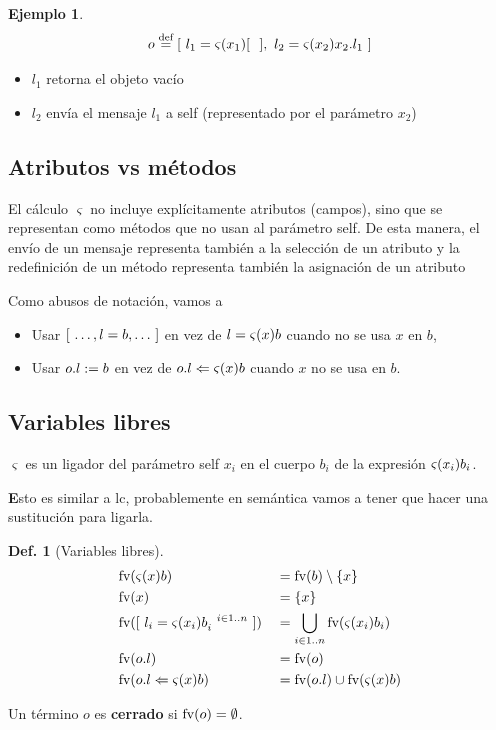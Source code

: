 \documentclass{report}
\theoremstyle{definition} %
\newtheorem{definition}{Def.}[chapter]
\newtheorem*{example*}{Ejemplo}
\newenvironment{nota}[1]
    {\begin{leftbar}\textbf{#1}}
    {\end{leftbar}}
\newcommand{\eqdef}{\overset{\text{def}}{=}}
\begin{document}
\begin{example*}
    \[
    o \eqdef \obj{
        \attr{l_1}{\met{x_1}{\obj{}}},\
        \attr{l_2}{\met{x_2}{\sel{x_2}{l_1}}}
    }
    \]

    \begin{itemize}
        \item $l_1$ retorna el objeto vacío
        \item $l_2$ envía el mensaje $l_1$ a self (representado por el parámetro $x_2$)
    \end{itemize}
\end{example*}

\subsection{Atributos vs métodos}

El cálculo $\varsigma$ no incluye explícitamente atributos (campos), sino que se
representan como métodos que no usan al parámetro self. De esta manera, el envío
de un mensaje representa también a la selección de un atributo y la redefinición
de un método representa también la asignación de un atributo

Como abusos de notación, vamos a

\begin{itemize}
    \item Usar $[\ \dots, l = b, \dots\ ]$ en vez de
    $l = \varsigma (x) b$ cuando no se usa $x$ en $b$,
    \item Usar $o.l := b$ en vez de $o.l \Leftarrow \varsigma (x) b$ cuando $x$
    no se usa en $b$.
\end{itemize}

\subsection{Variables libres}

$\varsigma$ es un ligador del parámetro self $x_i$ en el cuerpo $b_i$ de la
expresión $\varsigma (x_i) b_i$.

\begin{nota}
    Esto es similar a lc, probablemente en semántica vamos a tener que hacer una
    sustitución para ligarla.
\end{nota}

\begin{definition}[Variables libres]
\begin{alignat*}{2}
    &\text{fv}(\varsigma (x) b) &&= \text{fv}(b) \setminus \{ x \}\\
    &\text{fv}(x) &&= \{ x \} \\
    &\text{fv}([\ l_i = \varsigma (x_i) b_i^{\ \ i \in 1..n}\ ])
        &&= \bigcup_{i\in 1..n} \text{fv}(\varsigma (x_i) b_i)\\
    &\text{fv}(o.l) &&= \text{fv}(o) \\
    &\text{fv}(o.l \Leftarrow \varsigma (x) b) &&= \text{fv}(o.l) \cup \text{fv}(\varsigma (x) b)
\end{alignat*}

Un término $o$ es \textbf{cerrado} si $\text{fv}(o) = \emptyset$.
\end{definition}
\end{document}
